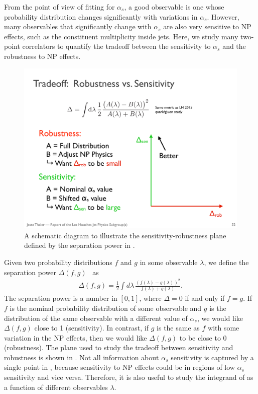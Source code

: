 
From the point of view of fitting for $\alpha_s$, a good observable is one whose probability distribution changes significantly with variations in $\alpha_s$.
%
However, many observables that significantly change with $\alpha_s$ are also very sensitive to NP effects, such as the constituent multiplicity inside jets.
%
Here, we study many two-point correlators to quantify the tradeoff between the sensitivity to $\alpha_s$ and the robustness to NP effects.

\begin{figure}[t]
\begin{center}
\includegraphics[width = 0.4\columnwidth]{figures/robustnessschematic.pdf}
\end{center}
\caption{A schematic diagram to illustrate the sensitivity-robustness plane defined by the separation power in .}
\label{fig:robustnessschematic}
\end{figure}

Given two probability distributions $f$ and $g$ in some observable $\lambda$, we define the separation power $\Delta(f,g)$~\cite{Harrison:1998yr} as
%
\begin{align}
\label{eq:seppower}
\Delta(f,g)=\frac{1}{2}\int d\lambda \, \frac{(f(\lambda)-g(\lambda))^2}{f(\lambda)+g(\lambda)}.
\end{align}
%
The separation power is a number in $[0,1]$, where $\Delta=0$ if and only if $f=g$.
%
If $f$ is the nominal probability distribution of some observable and $g$ is the distribution of the same observable with a different value of $\alpha_s$, we would like $\Delta(f,g)$ close to 1 (sensitivity).
%
In contrast, if $g$ is the same as $f$ with some variation in the NP effects, then we would like $\Delta(f,g)$ to be close to $0$ (robustness).
%
The plane used to study the tradeoff between sensitivity and robustness is shown in .
%
Not all information about $\alpha_s$ sensitivity is captured by a single point in , because sensitivity to NP effects could be in regions of low $\alpha_s$ sensitivity and vice versa.
%
Therefore, it is also useful to study the integrand of  as a function of different observables $\lambda$.


